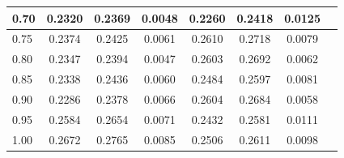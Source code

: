 \begin{singlespacing}
\begin{center}
\begin{threeparttable}
\begin{small}
\begin{tabular}{|l|c|c|c|c|c|c|c|}
        \hline
            0.70  & 0.2320 & 0.2369 & 0.0048   &  0.2260 & 0.2418 & 0.0125 \\
        \hline
            0.75  & 0.2374 & 0.2425 & 0.0061   &  0.2610 & 0.2718 & 0.0079 \\
        \hline
            0.80  & 0.2347 & 0.2394 & 0.0047   &  0.2603 & 0.2692 & 0.0062 \\
        \hline
            0.85  & 0.2338 & 0.2436 & 0.0060   &  0.2484 & 0.2597 & 0.0081 \\
        \hline
            0.90  & 0.2286 & 0.2378 & 0.0066   &  0.2604 & 0.2684 & 0.0058 \\
        \hline
            0.95  & 0.2584 & 0.2654 & 0.0071   &  0.2432 & 0.2581 & 0.0111 \\
        \hline
            1.00  & 0.2672 & 0.2765 & 0.0085   &  0.2506 & 0.2611 & 0.0098 \\
        \hline
        \end{tabular}
    \end{small}
    \end{threeparttable}
\end{center}
\end{singlespacing}
